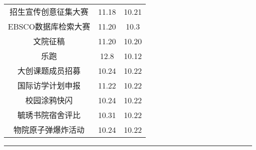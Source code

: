 \documentclass[letterpaper, 12pt]{article}
\begin{document}
\begin{multicols}{2}
{\begin{longtable}{|c|c|c|}
    招生宣传创意征集大赛 & 11.18 & 10.21\\ 
    EBSCO数据库检索大赛 & 11.20 & 10.3\\
    文院征稿 & 11.20 & 10.20\\
    乐跑 & 12.8 & 10.12\\
    大创课题成员招募 & 10.24 & 10.22\\
    国际访学计划申报 & 11.22 & 10.22\\
    校园涂鸦快闪 & 10.24 & 10.22\\
    毓琇书院宿舍评比 & 10.31 & 10.22\\
    物院原子弹爆炸活动 & 10.24 & 10.22\\
    
    \hline
\end{longtable}
\unskip
\unpenalty
\unpenalty}\unvbox\colbbox
\end{multicols}
\hrule
\pagebreak
\end{document}
